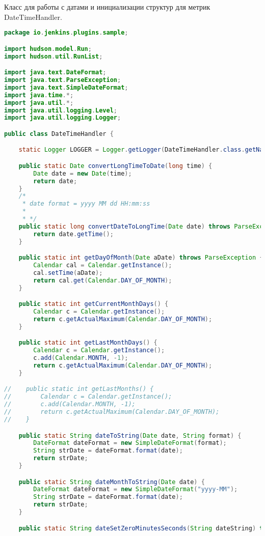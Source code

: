 Класс для работы с датами и инициализации структур для метрик DateTimeHandler.

\begin{lstlisting}[language=Java]
package io.jenkins.plugins.sample;

import hudson.model.Run;
import hudson.util.RunList;

import java.text.DateFormat;
import java.text.ParseException;
import java.text.SimpleDateFormat;
import java.time.*;
import java.util.*;
import java.util.logging.Level;
import java.util.logging.Logger;

public class DateTimeHandler {

    static Logger LOGGER = Logger.getLogger(DateTimeHandler.class.getName());

    public static Date convertLongTimeToDate(long time) {
        Date date = new Date(time);
        return date;
    }
    /*
     * date format = yyyy MM dd HH:mm:ss
     *
     * */
    public static long convertDateToLongTime(Date date) throws ParseException {
        return date.getTime();
    }

    public static int getDayOfMonth(Date aDate) throws ParseException {
        Calendar cal = Calendar.getInstance();
        cal.setTime(aDate);
        return cal.get(Calendar.DAY_OF_MONTH);
    }

    public static int getCurrentMonthDays() {
        Calendar c = Calendar.getInstance();
        return c.getActualMaximum(Calendar.DAY_OF_MONTH);
    }

    public static int getLastMonthDays() {
        Calendar c = Calendar.getInstance();
        c.add(Calendar.MONTH, -1);
        return c.getActualMaximum(Calendar.DAY_OF_MONTH);
    }

//    public static int getLastMonths() {
//        Calendar c = Calendar.getInstance();
//        c.add(Calendar.MONTH, -1);
//        return c.getActualMaximum(Calendar.DAY_OF_MONTH);
//    }

    public static String dateToString(Date date, String format) {
        DateFormat dateFormat = new SimpleDateFormat(format);
        String strDate = dateFormat.format(date);
        return strDate;
    }

    public static String dateMonthToString(Date date) {
        DateFormat dateFormat = new SimpleDateFormat("yyyy-MM");
        String strDate = dateFormat.format(date);
        return strDate;
    }

    public static String dateSetZeroMinutesSeconds(String dateString) throws ParseException {


\end{lstlisting}
